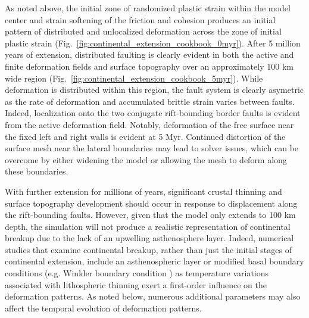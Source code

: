 As noted above, the initial zone of randomized plastic strain within the model center and strain softening of the friction and cohesion produces an initial pattern of distributed and unlocalized deformation across the zone of initial plastic strain (Fig.~\ref{fig:continental_extension_cookbook_0myr}). After 5 million years of extension, distributed faulting is clearly evident in both the active and finite deformation fields and surface topography over an approximately 100 km wide region (Fig.~\ref{fig:continental_extension_cookbook_5myr}). While deformation is distributed within this region, the fault system is clearly asymetric as the rate of deformation and accumulated brittle strain varies between faults. Indeed, localization onto the two conjugate rift-bounding border faults is evident from the active deformation field. Notably, deformation of the free surface near the fixed left and right walls is evident at 5 Myr. Continued distortion of the surface mesh near the lateral boundaries may lead to solver issues, which can be overcome by either widening the model or allowing the mesh to deform along these boundaries.  

With further extension for millions of years, significant crustal thinning and surface topography development should occur in response to displacement along the rift-bounding faults. However, given that the model only extends to 100 km depth, the simulation will not produce a realistic representation of continental breakup due to the lack of an upwelling asthenosphere layer. Indeed, numerical studies that examine continental breakup, rather than just the initial stages of continental extension, include an asthenospheric layer or modified basal boundary conditions (e.g. Winkler boundary condition \cite[for example]{Bru14}) as temperature variations associated with lithospheric thinning exert a first-order influence on the deformation patterns. As noted below, numerous additional parameters may also affect the temporal evolution of deformation patterns.


